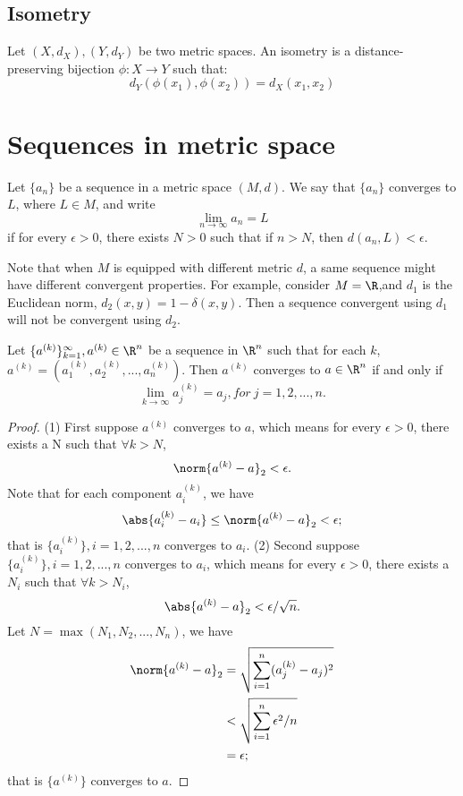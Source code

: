\begin{refsection}
\subsection{Isometry}
\begin{definition}[isometry]
Let $(X,d_X),(Y,d_Y)$ be two metric spaces. An isometry is a distance-preserving bijection $\phi: X\rightarrow Y$ such that:
$$d_Y(\phi(x_1),\phi(x_2)) = d_X(x_1,x_2)$$	
\end{definition}


\section{Sequences in metric space}
\begin{definition}\cite[125]{johnsonbaugh2010foundations}
Let $\{a_n\}$ be a sequence in a metric space $(M,d)$. We say that $\{a_n\}$ converges to $L$, where $L \in M$, and write $$\lim_{n\rightarrow \infty} a_n = L$$
if for every $\epsilon > 0$, there exists $N>0$ such that if $n > N$, then $d(a_n,L) < \epsilon$.
\end{definition}
\begin{remark}
Note that when $M$ is equipped with different metric $d$, a same sequence might have different convergent properties. For example, consider $M=\R$,and $d_1$ is the Euclidean norm, $d_2(x,y)=1-\delta(x,y)$. Then a sequence convergent using $d_1$ will not be convergent using $d_2$.
\end{remark}


\begin{theorem}\label{ch:metric-space:th:componentWiseConvergenceConditionForConvergenceInRn}\cite[126]{johnsonbaugh2010foundations}
Let $\{a^{(k)}\}_{k=1}^\infty,a^{(k)}\in \R^n$ be a sequence in $\R^n$ such that for each $k$, $a^{(k)}=(a^{(k)}_1,a^{(k)}_2,...,a^{(k)}_n)$. Then $a^{(k)}$ converges to $a\in \R^n$ if and only if 
$$\lim_{k\to\infty} a_j^{(k)} = a_j, for~ j=1,2,...,n.$$ 	
\end{theorem}
\begin{proof}
(1) First suppose $a^{(k)}$ converges to $a$, which means for every $\epsilon > 0$, there exists a N such that $\forall k > N$, 
$$\norm{a^{(k)} - a}_2 < \epsilon.$$
Note that for each component $a^{(k)}_i$, we have
$$\abs{a^{(k)}_i - a_i}\leq \norm{a^{(k)} - a}_2 < \epsilon;$$
that is $\{a^{(k)}_i\},i=1,2,...,n$ converges to $a_i$.
(2) Second suppose $\{a^{(k)}_i\},i=1,2,...,n$ converges to $a_i$, which means for every $\epsilon > 0$, there exists a $N_i$ such that $\forall k > N_i$, 
$$\abs{a^{(k)} - a}_2 < \epsilon/\sqrt{n}.$$
Let $N = \max (N_1,N_2,...,N_n)$, we have
\begin{align*}
\norm{a^{(k)} - a}_2 &= \sqrt{\sum_{i=1}^n (a^{(k)}_j - a_j)^2} \\
&< \sqrt{\sum_{i=1}^n \epsilon^2/n} \\
& = \epsilon;
\end{align*}
that is $\{a^{(k)}\}$ converges to $a$.
\end{proof}





\end{refsection}
